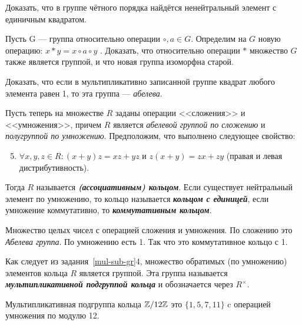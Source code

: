 \documentclass{article}
\begin{document}
    \begin{task_boxed}
        Доказать, что в группе чётного порядка найдётся ненейтральный элемент с единичным квадратом.
    \end{task_boxed}

    \begin{task_boxed}
        Пусть G — группа относительно операции $\circ, a \in G$.
        Определим на $ G $ новую операцию: $ x \ast y = x \circ a \circ y $ .
        Доказать, что относительно операции $\ast$ множество $G$ также является группой, и что новая группа изоморфна старой.
    \end{task_boxed}

    \begin{task_boxed}[ *]
        Доказать, что если в мультипликативно записанной группе квадрат любого элемента равен 1, то эта группа — \textit{абелева}.
    \end{task_boxed}


    \begin{definition_boxed}
        Пусть теперь на множестве $R$ заданы операции <<сложения>> и <<умножения>>, причем $R$ является \textit{абелевой группой по сложению} и \textit{полугруппой по умножению}.
        Предположим, что выполнено следующее свойство:
        \begin{enumerate}[label*=\textbf{(\arabic{enumi})}]
            \setcounter{enumi}{4}

            \item $\forall x, y, z \in R : (x + y)z = xz + yz$ и $z(x + y) = zx + zy$ (правая и левая дистрибутивность).
        \end{enumerate}
        Тогда $R$ называется \textbf{\textit{(ассоциативным) кольцом}}.
        Если существует нейтральный элемент по умножению, то кольцо называется \textbf{\textit{кольцом с единицей}}, если умножение коммутативно, то \textbf{\textit{коммутативным кольцом}}.
    \end{definition_boxed}

    \begin{example}
        Множество целых чисел с операцией сложения и умножения.
        По сложению это \textit{Абелева группа}.
        По умножению есть 1.
        Так что это коммутативное кольцо с 1.
    \end{example}

    \begin{definition_boxed}
        Как следует из задания~\ref{mul-sub-gr}4, множество обратимых (по умножению) элементов кольца $R$ является группой.
        Эта группа называется \textbf{\textit{мультипликативной подгруппой кольца}} и обозначается через $R^\times$.
    \end{definition_boxed}
    \begin{example}
        Мультипликативная подгруппа кольца $\mathbb{Z}/12\mathbb{Z}$ это $\{1,5,7,11\}$ c операцией умножения по модулю 12.
    \end{example}
\end{document}
